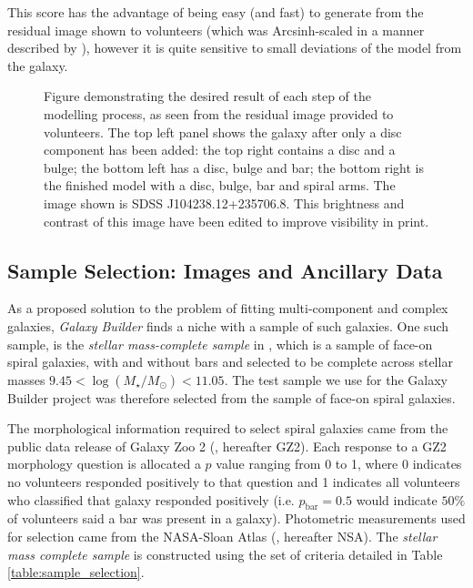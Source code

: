 \documentclass[../main.tex]{subfiles}
\begin{document}
This score has the advantage of being easy (and fast) to generate from the residual image shown to volunteers (which was Arcsinh-scaled in a manner described by \citealt{Lupton2003:astro-ph/0312483v1}), however it is quite sensitive to small deviations of the model from the galaxy.

\begin{figure}
  \caption{Figure demonstrating the desired result of each step of the modelling process, as seen from the residual image provided to volunteers. The top left panel shows the galaxy after only a disc component has been added: the top right contains a disc and a bulge; the bottom left has a disc, bulge and bar; the bottom right is the finished model with a disc, bulge, bar and spiral arms. The image shown is SDSS J104238.12+235706.8. This brightness and contrast of this image have been edited to improve visibility in print.}
  \label{fig:residualsStepByStep}
\end{figure}


\subsection{Sample Selection: Images and Ancillary Data}
\label{sec:data}

As a proposed solution to the problem of fitting multi-component and complex galaxies, \textit{Galaxy Builder} finds a niche with a sample of such galaxies. One such sample, is the \textit{stellar mass-complete sample} in \citet{2017MNRAS.472.2263H}, which is a sample of face-on spiral galaxies, with and without bars and selected to be complete across stellar masses $9.45 < \log(M_\star / M_\odot) < 11.05$. The test sample we use for the Galaxy Builder project was therefore selected from the \citet{2017MNRAS.472.2263H} sample of face-on spiral galaxies.

The morphological information required to select spiral galaxies came from the public data release of Galaxy Zoo 2 (\citealt{Willett2013:1308.3496v2}, hereafter GZ2). Each response to a GZ2 morphology question is allocated a $p$ value ranging from 0 to 1, where 0 indicates no volunteers responded positively to that question and 1 indicates all volunteers who classified that galaxy responded positively (i.e. $p_\text{bar} = 0.5$ would indicate $50\%$ of volunteers said a bar was present in a galaxy). Photometric measurements used for selection came from the NASA-Sloan Atlas (\citealt{2011AJ....142...31B}, hereafter NSA). The \textit{stellar mass complete sample} is constructed using the set of criteria detailed in Table \ref{table:sample_selection}.
\end{document}
